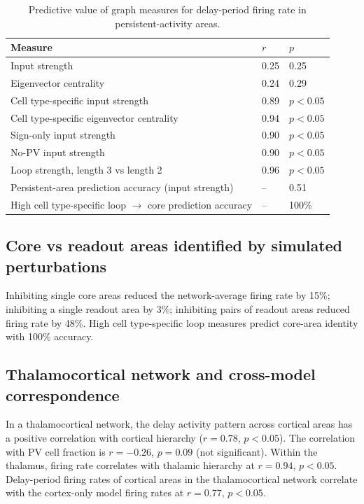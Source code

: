 \documentclass[11pt]{article}
\begin{document}
\begin{table}[h]
\centering
\caption{Predictive value of graph measures for delay-period firing rate in persistent-activity areas.}
\begin{tabular}{lll}
\toprule
Measure & $r$ & $p$ \\
\midrule
Input strength & 0.25 & 0.25 \\
Eigenvector centrality & 0.24 & 0.29 \\
Cell type-specific input strength & 0.89 & $p < 0.05$ \\
Cell type-specific eigenvector centrality & 0.94 & $p < 0.05$ \\
Sign-only input strength & 0.90 & $p < 0.05$ \\
No-PV input strength & 0.90 & $p < 0.05$ \\
Loop strength, length 3 vs length 2 & 0.96 & $p < 0.05$ \\
Persistent-area prediction accuracy (input strength) & -- & 0.51 \\
High cell type-specific loop $\to$ core prediction accuracy & -- & 100\% \\
\bottomrule
\end{tabular}
\end{table}

\subsection{Core vs readout areas identified by simulated perturbations}
Inhibiting single core areas reduced the network-average firing rate by 15\%; inhibiting a single readout area by 3\%; inhibiting pairs of readout areas reduced firing rate by 48\%. High cell type-specific loop measures predict core-area identity with 100\% accuracy.

\subsection{Thalamocortical network and cross-model correspondence}
In a thalamocortical network, the delay activity pattern across cortical areas has a positive correlation with cortical hierarchy ($r = 0.78$, $p < 0.05$). The correlation with PV cell fraction is $r = -0.26$, $p = 0.09$ (not significant). Within the thalamus, firing rate correlates with thalamic hierarchy at $r = 0.94$, $p < 0.05$. Delay-period firing rates of cortical areas in the thalamocortical network correlate with the cortex-only model firing rates at $r = 0.77$, $p < 0.05$.
\end{document}
